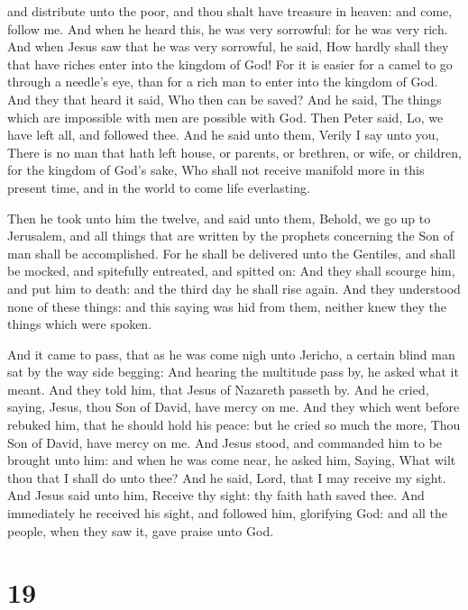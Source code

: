 and distribute unto the poor, and thou shalt have treasure in heaven:
and come, follow me.  And when he heard this, he was very
sorrowful: for he was very rich.  And when Jesus saw that
he was very sorrowful, he said, How hardly shall they that have riches
enter into the kingdom of God!  For it is easier for a
camel to go through a needle's eye, than for a rich man to enter into
the kingdom of God.  And they that heard it said, Who then
can be saved?  And he said, The things which are impossible
with men are possible with God.  Then Peter said, Lo, we
have left all, and followed thee.  And he said unto them,
Verily I say unto you, There is no man that hath left house, or parents,
or brethren, or wife, or children, for the kingdom of God's sake,
 Who shall not receive manifold more in this present time,
and in the world to come life everlasting.

 Then he took unto him the twelve, and said unto them,
Behold, we go up to Jerusalem, and all things that are written by the
prophets concerning the Son of man shall be accomplished. 
For he shall be delivered unto the Gentiles, and shall be mocked, and
spitefully entreated, and spitted on:  And they shall
scourge him, and put him to death: and the third day he shall rise
again.  And they understood none of these things: and this
saying was hid from them, neither knew they the things which were
spoken.

 And it came to pass, that as he was come nigh unto
Jericho, a certain blind man sat by the way side begging: 
And hearing the multitude pass by, he asked what it meant. 
And they told him, that Jesus of Nazareth passeth by.  And
he cried, saying, Jesus, thou Son of David, have mercy on me.
 And they which went before rebuked him, that he should
hold his peace: but he cried so much the more, Thou Son of David, have
mercy on me.  And Jesus stood, and commanded him to be
brought unto him: and when he was come near, he asked him, 
Saying, What wilt thou that I shall do unto thee? And he said, Lord,
that I may receive my sight.  And Jesus said unto him,
Receive thy sight: thy faith hath saved thee.  And
immediately he received his sight, and followed him, glorifying God: and
all the people, when they saw it, gave praise unto God.

\hypertarget{section-18}{%
\section{19}\label{section-18}}


